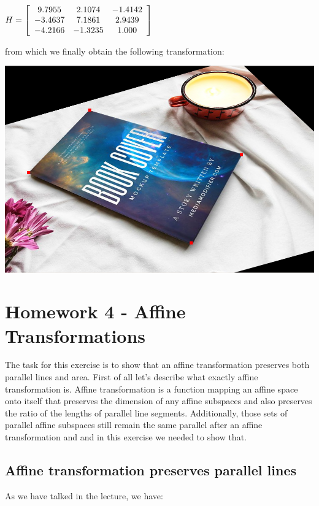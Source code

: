 \documentclass[]{article}
\begin{document}
\vspace{0.5em}

\centerline {
	$H = \left[ {\begin{array}{*{20}c}
		9.7955 & 2.1074 & -1.4142 \\
		-3.4637 & 7.1861 & 2.9439 \\
		-4.2166 & -1.3235 & 1.000
		\end{array} } \right] $
}

\vspace{0.5em}

from which we finally obtain the following transformation:

\vspace{0.5em}
\centerline {
	\includegraphics[scale=0.4]{out}
}

\vspace{0.5em}

\section{Homework 4 - Affine Transformations}

The task for this exercise is to show that an affine transformation preserves both parallel lines and area. First of all let's describe what exactly affine transformation is. Affine transformation is a function mapping an affine space onto itself that preserves the dimension of any affine subspaces and also preserves the ratio of the lengths of parallel line segments. Additionally, those sets of parallel affine subspaces still remain the same parallel after an affine transformation and and in this exercise we needed to show that. 

\subsection{Affine transformation preserves parallel lines}
As we have talked in the lecture, we have: 
\end{document}
